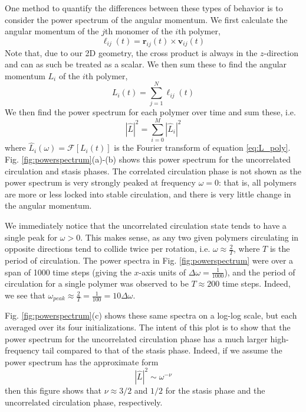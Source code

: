 \documentclass[11pt]{ucthesis}
\begin{document}
One method to quantify the differences between these types of behavior is to consider the power spectrum of the angular momentum. We first calculate the angular momentum of the $j$th monomer of the $i$th polymer,
\begin{equation}
\label{eq:L_mon}
\ell_{ij}(t) = \mathbf{r}_{ij}(t)\times \mathbf{v}_{ij}(t)
\end{equation}
Note that, due to our 2D geometry, the cross product is always in the $z$-direction and can as such be treated as a scalar. We then sum these to find the angular momentum $L_{i}$ of the $i$th polymer,
\begin{equation}
\label{eq:L_poly}
L_i(t) = \sum_{j=1}^N \ell_{ij}(t)
\end{equation}
We then find the power spectrum for each polymer over time and sum these, i.e.
\begin{equation}
\label{eq:L_fin}
|\hat{L}|^2 = \sum_{i=0}^M|\hat{L}_i|^2
\end{equation}
where $\hat{L}_i(\omega) = \mathcal{F}[L_i(t)]$ is the Fourier transform of equation \ref{eq:L_poly}. Fig. \ref{fig:powerspectrum}(a)-(b) shows this power spectrum for the uncorrelated circulation and stasis phases. The correlated circulation phase is not shown as the power spectrum is very strongly peaked at frequency $\omega=0$: that is, all polymers are more or less locked into stable circulation, and there is very little change in the angular momentum. 

We immediately notice that the uncorrelated circulation state tends to have a single peak for $\omega>0$. This makes sense, as any two given polymers circulating in opposite directions tend to collide twice per rotation, i.e. $\omega \approx \frac{2}{T}$, where $T$ is the period of circulation. The power spectra in Fig. \ref{fig:powerspectrum} were over a span of 1000 time steps (giving the $x$-axis units of $\Delta\omega = \frac{1}{1000}$), and the period of circulation for a single polymer was observed to be $T\approx200$ time steps. Indeed, we see that $\omega_{peak}\approx \frac{2}{T} = \frac{1}{100} = 10\Delta\omega$.

Fig. \ref{fig:powerspectrum}(c) shows these same spectra on a log-log scale, but each averaged over its four initializations. The intent of this plot is to show that the power spectrum for the uncorrelated circulation phase has a much larger high-frequency tail compared to that of the stasis phase. Indeed, if we assume the power spectrum has the approximate form
\begin{equation}
|\hat{L}|^2 \sim \omega^{-\nu}
\end{equation} 
then this figure shows that $\nu\approx 3/2$ and $1/2$ for the stasis phase and the uncorrelated circulation phase, respectively.
\end{document}

